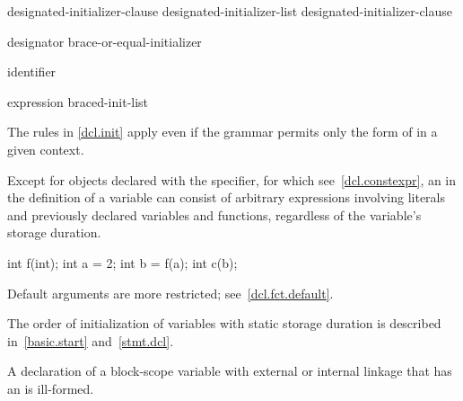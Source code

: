 \begin{bnf}
\br
    designated-initializer-clause\br
    designated-initializer-list \terminal{,} designated-initializer-clause
\end{bnf}

\begin{bnf}
\br
    designator brace-or-equal-initializer
\end{bnf}

\begin{bnf}
\br
     identifier
\end{bnf}

\begin{bnf}
\br
    expression\br
    braced-init-list
\end{bnf}

\begin{note}
The rules in \ref{dcl.init} apply even if the grammar permits only
the  form
of  in a given context.
\end{note}

\pnum
Except for objects declared with the  specifier, for which see~\ref{dcl.constexpr},
an  in the definition of a variable can consist of
arbitrary expressions involving literals and previously declared
variables and functions,
regardless of the variable's storage duration.
\begin{example}
\begin{codeblock}
int f(int);
int a = 2;
int b = f(a);
int c(b);
\end{codeblock}
\end{example}

\pnum
\begin{note}
Default arguments are more restricted; see~\ref{dcl.fct.default}.
\end{note}

\pnum
\begin{note}
The order of initialization of variables with static storage duration is described in~\ref{basic.start}
and~\ref{stmt.dcl}.
\end{note}

\pnum
A declaration of a block-scope variable with external or internal
linkage that has an  is ill-formed.

